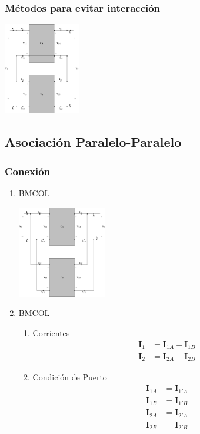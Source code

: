 \subsubsection{Métodos para evitar interacción}
\label{sec:org7265967}

\includegraphics[height=4cm]{../figs/serie-serie-corto.pdf}


\subsection{Asociación Paralelo-Paralelo}
\label{sec:org3afa958}
\subsubsection{Conexión}
\label{sec:org39169d7}
\begin{enumerate}
\item \hfill{}\textsc{BMCOL}
\label{sec:org8edd165}

\includegraphics[height=4cm]{../figs/paralelo-paralelo.pdf}

\item \hfill{}\textsc{BMCOL}
\label{sec:orgc8c6f3c}
\begin{enumerate}
\item Corrientes
\label{sec:orgb710c53}
\begin{align*}
  \mathbf{I}_1 &= \mathbf{I}_{1A} + \mathbf{I}_{1B}\\
  \mathbf{I}_2 &= \mathbf{I}_{2A} + \mathbf{I}_{2B}
\end{align*}

\item Condición de Puerto
\label{sec:orgf90580b}
\begin{align*}
  \mathbf{I}_{1A} &= \mathbf{I}_{1'A}\\
  \mathbf{I}_{1B} &= \mathbf{I}_{1'B}\\
  \mathbf{I}_{2A} &= \mathbf{I}_{2'A}\\
  \mathbf{I}_{2B} &= \mathbf{I}_{2'B}
\end{align*}
\end{enumerate}
\end{enumerate}


